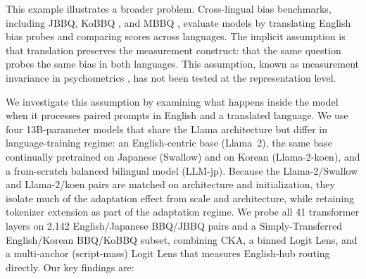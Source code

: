 \documentclass[11pt]{article}
\begin{document}
This example illustrates a broader problem. Cross-lingual bias benchmarks, including JBBQ, KoBBQ \citep{jin-etal-2024-kobbq}, and MBBQ \citep{neplenbroek-etal-2024-mbbq}, evaluate models by translating English bias probes and comparing scores across languages. The implicit assumption is that translation preserves the measurement construct: that the same question probes the same bias in both languages. This assumption, known as measurement invariance in psychometrics \citep{vandenberg2000review}, has not been tested at the representation level.

We investigate this assumption by examining what happens inside the model when it processes paired prompts in English and a translated language. We use four 13B-parameter models that share the Llama architecture but differ in language-training regime: an English-centric base (Llama~2), the same base continually pretrained on Japanese (Swallow) and on Korean (Llama-2-koen), and a from-scratch balanced bilingual model (LLM-jp). Because the Llama-2/Swallow and Llama-2/koen pairs are matched on architecture and initialization, they isolate much of the adaptation effect from scale and architecture, while retaining tokenizer extension as part of the adaptation regime. We probe all 41 transformer layers on 2,142 English/Japanese BBQ/JBBQ pairs and a Simply-Transferred English/Korean BBQ/KoBBQ subset, combining CKA, a binned Logit Lens, and a multi-anchor (script-mass) Logit Lens that measures English-hub routing directly. Our key findings are:
\end{document}
